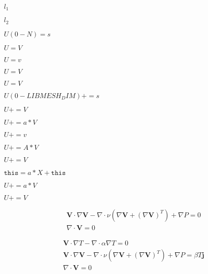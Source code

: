 \documentclass{article}
\begin{document}
$l_1$
\pagebreak

$l_2$
\pagebreak

$U(0-N) = s$
\pagebreak

$U = V$
\pagebreak

$ U=v $
\pagebreak

$U=V$
\pagebreak

$ U=V $
\pagebreak

$U(0-LIBMESH_DIM)+=s$
\pagebreak

$U+=V$
\pagebreak

$U+=a*V$
\pagebreak

$ U+=v $
\pagebreak

$U+=A*V$
\pagebreak

$ U+=V $
\pagebreak

$\texttt{this} = a*X + \texttt{this} $
\pagebreak

$ U+=a*V $
\pagebreak

$U+=V $
\pagebreak

\begin{eqnarray*}
&& \mathbf{V} \cdot \nabla \mathbf{V} - \nabla \cdot \nu (\nabla \mathbf{V} +(\nabla \mathbf{V})^T)
+\nabla P = 0 \\
&& \nabla \cdot \mathbf{V} = 0
\end{eqnarray*}
\pagebreak

\begin{eqnarray*}
&& \mathbf{V} \cdot \nabla T - \nabla \cdot\alpha \nabla T = 0 \\
&& \mathbf{V} \cdot \nabla \mathbf{V} - \nabla \cdot \nu (\nabla \mathbf{V} +(\nabla \mathbf{V})^T)
+\nabla P = \beta T \mathbf{j} \\
&& \nabla \cdot \mathbf{V} = 0
\end{eqnarray*}
\pagebreak
\end{document}
